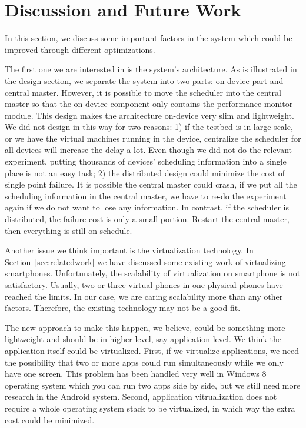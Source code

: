 \section{Discussion and Future Work}\label{sec:discussion}
In this section, we discuss some important factors in the system which could be improved through different optimizations.

The first one we are interested in is the system's architecture. As is illustrated in the design section, we separate the system into two parts: on-device part and central master. However, it is possible to move the scheduler into the central master so that the on-device component only contains the performance monitor module. This design makes the architecture on-device very slim and lightweight. We did not design in this way for two reasons: 1) if the testbed is in large scale, or we have the virtual machines running in the device, centralize the scheduler for all devices will increase the delay a lot. Even though we did not do the relevant experiment, putting thousands of devices' scheduling information into a single place is not an easy task; 2) the distributed design could minimize the cost of single point failure. It is possible the central master could crash, if we put all the scheduling information in the central master, we have to re-do the experiment again if we do not want to lose any information. In contrast, if the scheduler is distributed, the failure cost is only a small portion. Restart the central master, then everything is still on-schedule.

Another issue we think important is the virtualization technology. In Section~\ref{sec:relatedwork} we have discussed some existing work of virtualizing smartphones. Unfortunately, the scalability of virtualization on smartphone is not satisfactory. Usually, two or three virtual phones in one physical phones have reached the limits. In our case, we are caring scalability more than any other factors. Therefore, the existing technology may not be a good fit.

The new approach to make this happen, we believe, could be something more lightweight and should be in higher level, say application level. We think the application itself could be virtualized. First, if we virtualize applications, we need the possibility that two or more apps could run simultaneously while we only have one screen. This problem has been handled very well in Windows 8 operating system which you can run two apps side by side, but we still need more research in the Android system. Second, application vitrualization does not require a whole operating system stack to be virtualized, in which way the extra cost could be minimized.
